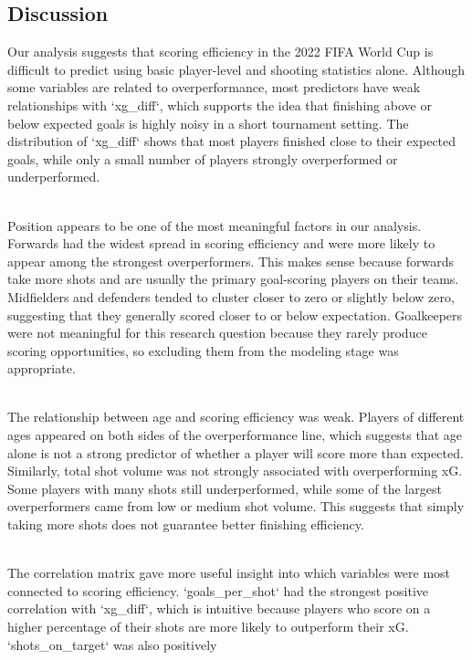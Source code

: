 \documentclass[
  letterpaper,
  DIV=11,
  numbers=noendperiod]{scrartcl}
\begin{document}
\subsection{Discussion}\label{discussion}

Our analysis suggests that scoring efficiency in the 2022 FIFA World Cup
is difficult to predict using basic player-level and shooting statistics
alone. Although some variables are related to overperformance, most
predictors have weak relationships with `xg\_diff`, which supports the
idea that finishing above or below expected goals is highly noisy in a
short tournament setting. The distribution of `xg\_diff` shows that most
players finished close to their expected goals, while only a small
number of players strongly overperformed or underperformed.\\
\strut \\
Position appears to be one of the most meaningful factors in our
analysis. Forwards had the widest spread in scoring efficiency and were
more likely to appear among the strongest overperformers. This makes
sense because forwards take more shots and are usually the primary
goal-scoring players on their teams. Midfielders and defenders tended to
cluster closer to zero or slightly below zero, suggesting that they
generally scored closer to or below expectation. Goalkeepers were not
meaningful for this research question because they rarely produce
scoring opportunities, so excluding them from the modeling stage was
appropriate.\\
\strut \\
The relationship between age and scoring efficiency was weak. Players of
different ages appeared on both sides of the overperformance line, which
suggests that age alone is not a strong predictor of whether a player
will score more than expected. Similarly, total shot volume was not
strongly associated with overperforming xG. Some players with many shots
still underperformed, while some of the largest overperformers came from
low or medium shot volume. This suggests that simply taking more shots
does not guarantee better finishing efficiency.\\
\strut \\
The correlation matrix gave more useful insight into which variables
were most connected to scoring efficiency. `goals\_per\_shot` had the
strongest positive correlation with `xg\_diff`, which is intuitive
because players who score on a higher percentage of their shots are more
likely to outperform their xG. `shots\_on\_target` was also positively
\end{document}
